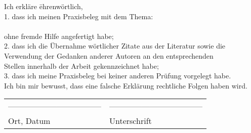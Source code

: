 

\cleardoublepage 
{}
			\begin{tabbing}
		Ich erkläre \= ehrenwörtlich,\\[1cm]
		1. 	\> dass ich meinen Praxisbeleg mit dem Thema:\\[1cm]
		   	\> \vartiteltitel\\[1cm]
		ohne fremde Hilfe angefertigt habe;\\[1cm]
		
		2.	\> dass ich die Übernahme wörtlicher Zitate aus der Literatur sowie die\\ 		  
			\>Verwendung der Gedanken anderer Autoren an den entsprechenden\\
			\> Stellen innerhalb der Arbeit gekennzeichnet habe;\\[0.5cm]
		
		3.	\> dass ich meine Praxisbeleg bei keiner anderen Prüfung vorgelegt habe. \\[1cm]
		Ich bin mir bewusst, dass eine falsche Erklärung rechtliche Folgen haben wird. \\[2cm]
		\end{tabbing}
		
		 \begin{tabular}{p{8cm}l}
		  ----------------------------------- &  ----------------------------------- \\
		  Ort, Datum & Unterschrift  \\
		 \end{tabular}
